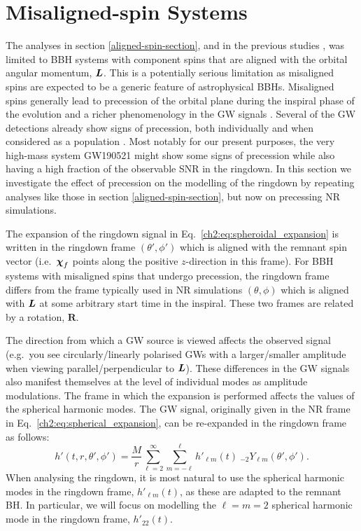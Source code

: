 \section{Misaligned-spin Systems}\label{misaligned-spin-section}

The analyses in section \ref{aligned-spin-section}, and in the previous studies \cite{Flanagan:1997sx, Berti:2007fi, Kamaretsos:2011um, London:2014cma, Carullo:2018sfu, Bhagwat:2017tkm, Giesler:2019uxc, Ota:2019bzl, Dhani:2020nik}, was limited to BBH systems with component spins that are aligned with the orbital angular momentum, $\vb*{L}$.
This is a potentially serious limitation as misaligned spins are expected to be a generic feature of astrophysical BBHs.
Misaligned spins generally lead to precession of the orbital plane during the inspiral phase of the evolution and a richer phenomenology in the GW signals \cite{Apostolatos:1994mx}.
Several of the GW detections already show signs of precession, both individually \cite{LIGOScientific:2020ibl, Gerosa:2020aiw} and when considered as a population \cite{LIGOScientific:2020kqk}.
Most notably for our present purposes, the very high-mass system GW190521 \cite{LIGOScientific:2020iuh, LIGOScientific:2020ufj} might show some signs of precession while also having a high fraction of the observable SNR in the ringdown. 
In this section we investigate the effect of precession on the modelling of the ringdown by repeating analyses like those in section \ref{aligned-spin-section}, but now on precessing NR simulations.

The expansion of the ringdown signal in Eq.~\ref{ch2:eq:spheroidal_expansion} is written in the ringdown frame $(\theta', \phi')$ which is aligned with the remnant spin vector (i.e.\ $\vb*{\chi}_f$ points along the positive $z$-direction in this frame). For BBH systems with misaligned spins that undergo precession, the ringdown frame differs from the frame typically used in NR simulations $(\theta, \phi)$ which is aligned with $\vb*{L}$ at some arbitrary start time in the inspiral.
These two frames are related by a rotation, $\mathbf{R}$.

The direction from which a GW source is viewed affects the observed signal 
(e.g.\ you see circularly/linearly polarised GWs with a larger/smaller amplitude when viewing parallel/perpendicular to $\vb*{L}$).
These differences in the GW signals also manifest themselves at the level of individual modes as amplitude modulations. The frame in which the expansion is performed affects the values of the spherical harmonic modes. 
The GW signal, originally given in the NR frame in Eq.~\ref{ch2:eq:spherical_expansion}, can be re-expanded in the ringdown frame as follows:
\begin{equation}\label{hprimedecomp}
    h'(t, r, \theta', \phi') = \frac{M}{r} \sum_{\ell = 2}^{\infty} \sum_{m = -\ell}^{\ell}  h'_{\ell m}(t) ~ {}_{-2}Y_{\ell m}(\theta', \phi').
\end{equation}
When analysing the ringdown, it is most natural to use the spherical harmonic modes in the ringdown frame, $h'_{\ell m}(t)$, as these are adapted to the remnant BH. 
In particular, we will focus on modelling the $\ell = m = 2$ spherical harmonic mode in the ringdown frame, $h'_{22}(t)$.

